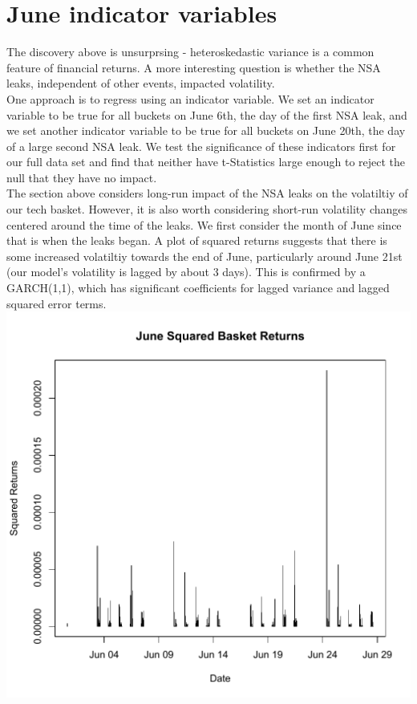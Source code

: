 \documentclass[11pt]{amsart}
\begin{document}
\newpage
\section{June indicator variables}

The discovery above is unsurprsing - heteroskedastic variance is a common feature of financial returns. A more interesting question is whether the NSA leaks, independent of other events, impacted volatility. \\

One approach is to regress using an indicator variable. We set an indicator variable to be true for all buckets on June 6th, the day of the first NSA leak, and we set another indicator variable to be true for all buckets on June 20th, the day of a large second NSA leak. We test the significance of these indicators first for our full data set and find that neither have t-Statistics large enough to reject the null that they have no impact. \\

The section above considers long-run impact of the NSA leaks on the volatiltiy of our tech basket. However, it is
also worth considering short-run volatility changes centered around the time of the leaks. We first consider the month of June since that is when the leaks began. A plot of squared returns suggests that there is some increased volatiltiy towards the end of June, particularly around June 21st (our model's volatility is lagged by about 3 days). This is confirmed by a GARCH(1,1), which has significant coefficients for lagged variance and lagged squared error terms. \\

\includegraphics[scale=0.6]{june_squared_basket_ret.pdf} \\
\end{document}

